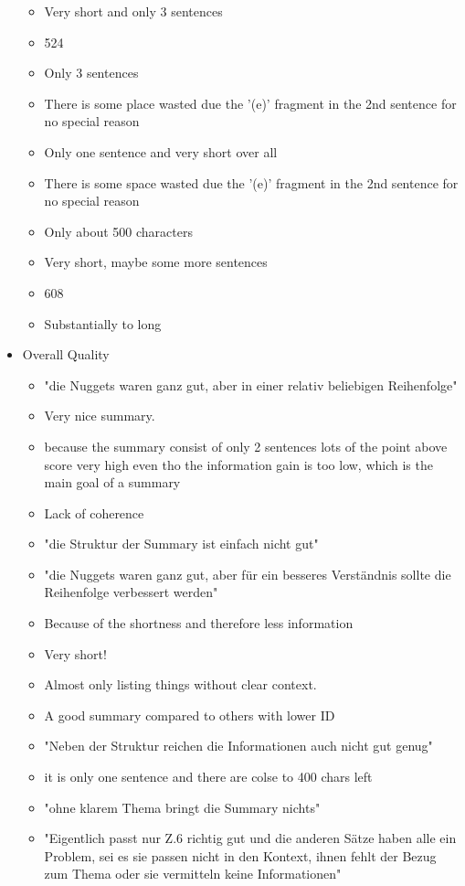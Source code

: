 \begin{itemize}[topsep = 0pt, itemsep = 0pt]
\begin{itemize}[topsep = 0pt, itemsep = 0pt]
		\item Very short and only 3 sentences
		\item 524
		\item Only 3 sentences
		\item There is some place wasted due the '(e)' fragment in the 2nd sentence for no special reason
		\item Only one sentence and very short over all
		\item There is some space wasted due the '(e)' fragment in the 2nd sentence for no special reason
		\item Only about 500 characters
		\item Very short, maybe some more sentences
		\item 608
		\item Substantially to long
	\end{itemize}
	\item Overall Quality
	\begin{itemize}[topsep = 0pt, itemsep = 0pt]
		\item "die Nuggets waren ganz gut, aber in einer relativ beliebigen Reihenfolge"
		\item Very nice summary.
		\item because the summary consist of only 2 sentences lots of the point above score very high even tho the information gain is too low, which is the main goal of a summary
		\item Lack of coherence
		\item "die Struktur der Summary ist einfach nicht gut"
		\item "die Nuggets waren ganz gut, aber für ein besseres Verständnis sollte die Reihenfolge verbessert werden"
		\item Because of the shortness and therefore less information
		\item Very short!
		\item Almost only listing things without clear context.
		\item A good summary compared to others with lower ID
		\item "Neben der Struktur reichen die Informationen auch nicht gut genug"
		\item it is only one sentence and there are colse to 400 chars left
		\item "ohne klarem Thema bringt die Summary nichts"
		\item "Eigentlich passt nur Z.6 richtig gut und die anderen Sätze haben alle ein Problem, sei es sie passen nicht in den Kontext, ihnen fehlt der Bezug zum Thema oder sie vermitteln keine Informationen"
	\end{itemize}
\end{itemize}
